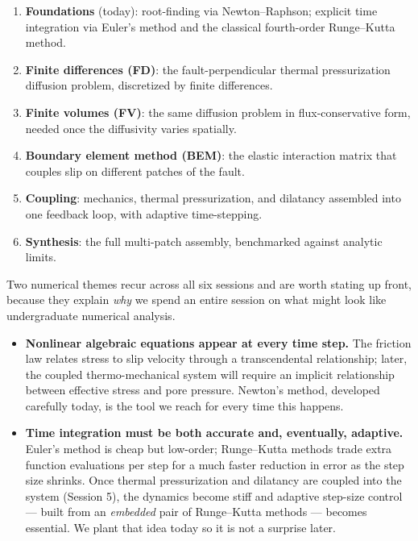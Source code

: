 \begin{enumerate}[label=\arabic*.]
\item \textbf{Foundations} (today): root-finding via Newton--Raphson; explicit time integration via Euler's method and the classical fourth-order Runge--Kutta method.
\item \textbf{Finite differences (FD)}: the fault-perpendicular thermal pressurization diffusion problem, discretized by finite differences.
\item \textbf{Finite volumes (FV)}: the same diffusion problem in flux-conservative form, needed once the diffusivity varies spatially.
\item \textbf{Boundary element method (BEM)}: the elastic interaction matrix that couples slip on different patches of the fault.
\item \textbf{Coupling}: mechanics, thermal pressurization, and dilatancy assembled into one feedback loop, with adaptive time-stepping.
\item \textbf{Synthesis}: the full multi-patch assembly, benchmarked against analytic limits.
\end{enumerate}

Two numerical themes recur across all six sessions and are worth stating up front, because they explain \emph{why} we spend an entire session on what might look like undergraduate numerical analysis.

\begin{itemize}
\item \textbf{Nonlinear algebraic equations appear at every time step.} The friction law relates stress to slip velocity through a transcendental relationship; later, the coupled thermo-mechanical system will require an implicit relationship between effective stress and pore pressure. Newton's method, developed carefully today, is the tool we reach for every time this happens.
\item \textbf{Time integration must be both accurate and, eventually, adaptive.} Euler's method is cheap but low-order; Runge--Kutta methods trade extra function evaluations per step for a much faster reduction in error as the step size shrinks. Once thermal pressurization and dilatancy are coupled into the system (Session 5), the dynamics become stiff and adaptive step-size control --- built from an \emph{embedded} pair of Runge--Kutta methods --- becomes essential. We plant that idea today so it is not a surprise later.
\end{itemize}

